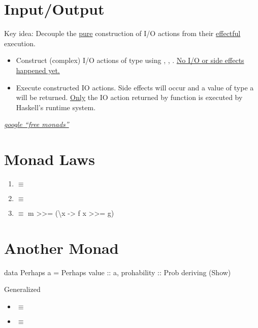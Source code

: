 \section*{Input/Output}
Key idea: Decouple the \underline{pure} construction of I/O actions from their \underline{effectful} execution.
\begin{itemize}
    \item Construct (complex) I/O actions of type  using , , \codeline{>>=}. \underline{No I/O or side effects happened yet.}
    \item Execute constructed IO actions. Side effects will occur and a value of type a will be returned. \underline{Only} the IO action returned by function  is executed by Haskell's runtime system.
\end{itemize}


\textit{\href{http://www.google.com/search?q=free+monads}{google ``free monads''}}


\section*{Monad Laws}

\begin{enumerate}
    \item {} $\equiv$ 
    \item {} $\equiv$ 
    \item {} $\equiv$ m >>= (\textbackslash x -> f x >>= g)
\end{enumerate}



\section*{Another Monad}

\begin{codebox}[haskell]
data Perhaps a = Perhaps { value :: a, prohability :: Prob}
deriving (Show)
\end{codebox}

Generalized 
\begin{itemize}
    \item {} $\equiv$ 
    \item {} $\equiv$ 
\end{itemize}

